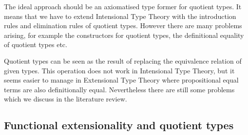 \documentclass{article}
\theoremstyle{definition}
\DeclareMathOperator{\Set}{\mathbf{Set}}
\newcommand{\itt}{Intensional Type Theory}
\newcommand{\ett}{Extensional Type Theory}
\begin{document}
The ideal approach should be an axiomatised type former for quotient
types. It means that we have to extend \itt{} with the introduction
rules and elimination rules of quotient types. However there are
many problems arising, for example the constructors for quotient types, the
definitional equality of quotient types etc.

Quotient types can be seen as the result of replacing the equivalence
relation of given types. This operation does not work in \itt{}, but it seems
easier to manage in \ett{} where
propositional equal terms are also definitionally equal. Nevertheless there
are still some problems which we discuss in the literature review.









\subsection{Functional extensionality and quotient types}
\end{document}
